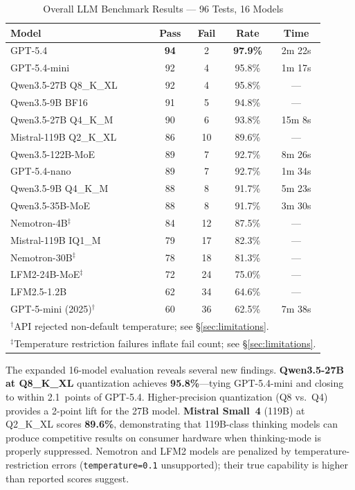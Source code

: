 \documentclass[onecolumn,10pt]{IEEEtran}
\begin{document}
\begin{table}[h]
\centering
\caption{Overall LLM Benchmark Results — 96 Tests, 16 Models}
\label{tab:overall}
\small
\begin{tabular}{p{3.2cm}cccc}
\toprule
\textbf{Model} & \textbf{Pass} & \textbf{Fail} & \textbf{Rate} & \textbf{Time} \\
\midrule
GPT-5.4 & \textbf{94} & 2 & \textbf{97.9\%} & 2m 22s \\
GPT-5.4-mini & 92 & 4 & 95.8\% & 1m 17s \\
Qwen3.5-27B Q8\_K\_XL & 92 & 4 & 95.8\% & --- \\
Qwen3.5-9B BF16 & 91 & 5 & 94.8\% & --- \\
Qwen3.5-27B Q4\_K\_M & 90 & 6 & 93.8\% & 15m 8s \\
Mistral-119B Q2\_K\_XL & 86 & 10 & 89.6\% & --- \\
Qwen3.5-122B-MoE & 89 & 7 & 92.7\% & 8m 26s \\
GPT-5.4-nano & 89 & 7 & 92.7\% & 1m 34s \\
Qwen3.5-9B Q4\_K\_M & 88 & 8 & 91.7\% & 5m 23s \\
Qwen3.5-35B-MoE & 88 & 8 & 91.7\% & 3m 30s \\
Nemotron-4B$^\ddagger$ & 84 & 12 & 87.5\% & --- \\
Mistral-119B IQ1\_M & 79 & 17 & 82.3\% & --- \\
Nemotron-30B$^\ddagger$ & 78 & 18 & 81.3\% & --- \\
LFM2-24B-MoE$^\ddagger$ & 72 & 24 & 75.0\% & --- \\
LFM2.5-1.2B & 62 & 34 & 64.6\% & --- \\
GPT-5-mini (2025)$^\dagger$ & 60 & 36 & 62.5\% & 7m 38s \\
\midrule
\multicolumn{5}{l}{\footnotesize $^\dagger$API rejected non-default temperature; see §\ref{sec:limitations}.} \\
\multicolumn{5}{l}{\footnotesize $^\ddagger$Temperature restriction failures inflate fail count; see §\ref{sec:limitations}.}
\end{tabular}
\end{table}

The expanded 16-model evaluation reveals several new findings.
\textbf{Qwen3.5-27B at Q8\_K\_XL} quantization achieves \textbf{95.8\%}---tying
GPT-5.4-mini and closing to within 2.1~points of GPT-5.4. Higher-precision
quantization (Q8 vs.\ Q4) provides a 2-point lift for the 27B model.
\textbf{Mistral Small~4} (119B) at Q2\_K\_XL scores \textbf{89.6\%},
demonstrating that 119B-class thinking models can produce competitive
results on consumer hardware when thinking-mode is properly suppressed.
Nemotron and LFM2 models are penalized by temperature-restriction errors
(\texttt{temperature=0.1} unsupported); their true capability is higher
than reported scores suggest.
\end{document}
